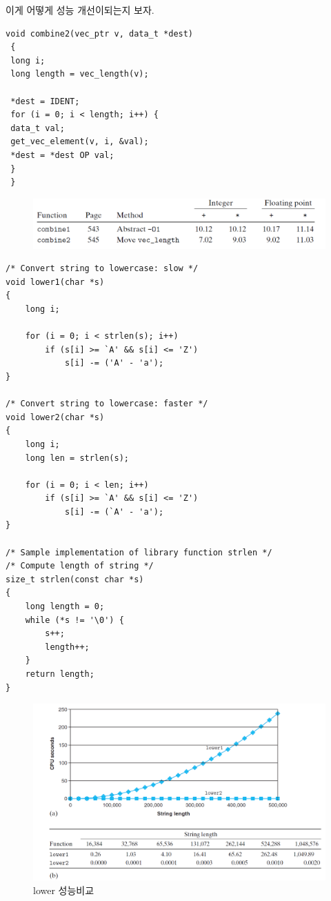 이게 어떻게 성능 개선이되는지 보자.

\begin{lstlisting}[style = CStyle]
void combine2(vec_ptr v, data_t *dest)
 {
 long i;
 long length = vec_length(v);

 *dest = IDENT;
 for (i = 0; i < length; i++) {
 data_t val;
 get_vec_element(v, i, &val);
 *dest = *dest OP val;
 }
 }
\end{lstlisting}


\begin{figure}[h!]
    \centering
    \includegraphics[scale=0.4]{pic/section5/pic1}
\end{figure}



\begin{lstlisting}[style = CStyle]
/* Convert string to lowercase: slow */
void lower1(char *s)
{
    long i;

    for (i = 0; i < strlen(s); i++)
        if (s[i] >= `A' && s[i] <= 'Z')
            s[i] -= ('A' - 'a');    
}

/* Convert string to lowercase: faster */
void lower2(char *s)
{
    long i;
    long len = strlen(s);

    for (i = 0; i < len; i++)
        if (s[i] >= `A' && s[i] <= 'Z')
            s[i] -= (`A' - 'a');
}

/* Sample implementation of library function strlen */
/* Compute length of string */
size_t strlen(const char *s)
{
    long length = 0;
    while (*s != '\0') {
        s++;
        length++;
    }
    return length;
}
\end{lstlisting}

\begin{figure}[h!]
    \centering
    \includegraphics[scale=0.4]{pic/section5/pic2}
    \caption{lower 성능비교}
\end{figure}

